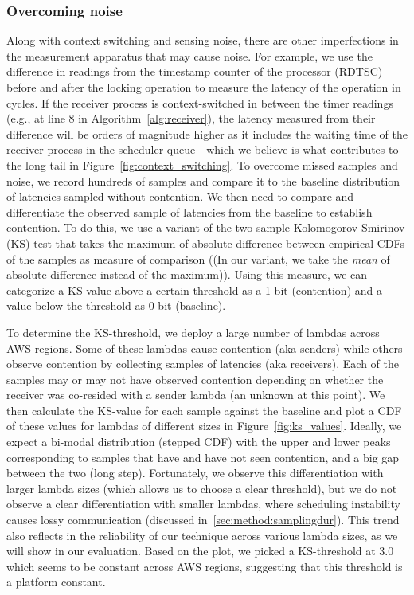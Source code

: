 \subsubsection{Overcoming noise} 
\label{sec:method:noise}
Along with context switching and sensing noise, there are other imperfections in
the measurement apparatus that may cause noise. For example, we use the difference in
readings from the timestamp counter of the processor (RDTSC) before and after
the locking operation to measure the latency of the operation in cycles. If the
receiver process is context-switched in between the timer readings (e.g., at
line 8 in Algorithm~\ref{alg:receiver}), the latency measured from their
difference will be orders of magnitude higher as it includes the waiting time of
the receiver process in the scheduler queue - which we believe is what
contributes to the long tail in Figure~\ref{fig:context_switching}. To overcome
missed samples and noise, we record hundreds of samples and compare it to the
baseline distribution of latencies sampled without contention. We then need to
compare and differentiate the observed sample of latencies from the baseline to
establish contention. To do this, we use a variant of the two-sample 
Kolomogorov-Smirinov (KS) test that takes the maximum of absolute difference between 
empirical CDFs of the samples as measure of comparison ((In our variant, we take the 
\emph{mean} of absolute difference instead of the maximum)). Using this measure,
we can categorize a KS-value above a certain threshold as a 1-bit (contention) and a 
value below the threshold as 0-bit (baseline).

To determine the KS-threshold, we deploy a large number of lambdas across AWS
regions. Some of these lambdas cause contention (aka senders) while others
observe contention by collecting samples of latencies (aka receivers). Each of
the samples may or may not have observed contention depending on whether the
receiver was co-resided with a sender lambda (an unknown at this point). We then
calculate the KS-value for each sample against the baseline and plot a CDF of
these values for lambdas of different sizes in Figure~\ref{fig:ks_values}.
Ideally, we expect a bi-modal distribution (stepped CDF) with the upper and
lower peaks corresponding to samples that have and have not seen contention, and
a big gap between the two (long step). Fortunately, we observe this
differentiation with larger lambda sizes (which allows us to choose a clear
threshold), but we do not observe a clear differentiation with smaller lambdas,
where scheduling instability causes lossy communication (discussed in~\ref{sec:method:samplingdur}).  
This trend also reflects in the reliability of our technique across various
lambda sizes, as we will show in our evaluation. Based on the plot, we picked a
KS-threshold at 3.0 which seems to be constant across AWS regions, suggesting
that this threshold is a platform constant.

